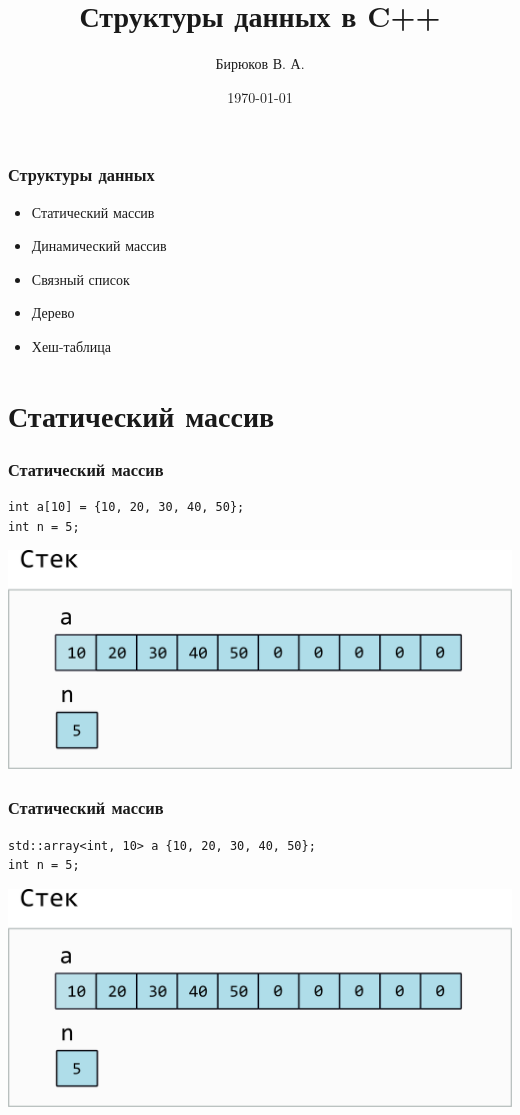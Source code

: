 \documentclass[10pt,pdf,hyperref={unicode}]{beamer}
\title{Структуры данных в C++}
\author{Бирюков В. А.}
\date{\today}
\begin{document}
\begin{frame}
\titlepage
\end{frame} 

\begin{frame}[fragile]
\frametitle{Структуры данных} 
\begin{itemize}
\item Статический массив
\item Динамический массив
\item Связный список
\item Дерево
\item Хеш-таблица
\end{itemize}
\end{frame}

\section{Статический массив} 

\begin{frame}[fragile]
\frametitle{Статический массив} 
\begin{lstlisting}
int a[10] = {10, 20, 30, 40, 50};
int n = 5;
\end{lstlisting}
\begin{center}
\includegraphics[scale=0.6]{images/static_array/static_array.png}
\end{center}
\end{frame}


\begin{frame}[fragile]
\frametitle{Статический массив} 
\begin{lstlisting}
std::array<int, 10> a {10, 20, 30, 40, 50};
int n = 5;
\end{lstlisting}
\begin{center}
\includegraphics[scale=0.6]{images/static_array/static_array.png}
\end{center}
\end{frame}
\end{document}
